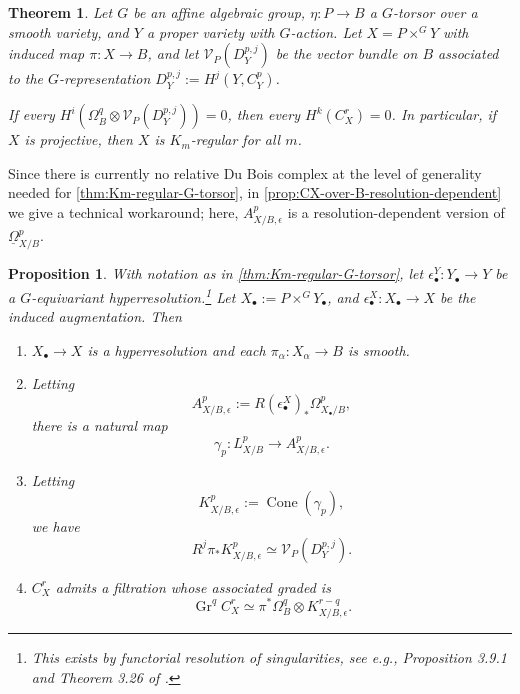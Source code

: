 \documentclass{amsart}
\newtheorem{theorem}{Theorem}[section]
\newtheorem{proposition}[proposition]{Proposition}
\theoremstyle{definition}
\newcommand{\cV}{\mathcal{V}}
\DeclareMathOperator{\Cone}{Cone}
\DeclareMathOperator{\Gr}{Gr}
\begin{document}
\begin{theorem}\label{thm:Km-regular-G-torsor}
Let $G$ be an affine algebraic group, $\eta\colon P\to B$ a $G$-torsor over a smooth variety, and $Y$ a proper variety with $G$-action. Let $X=P\times^G Y$ with induced map $\pi\colon X\to B$, and let $\cV_P(D_Y^{p,j})$ be the vector bundle on $B$ associated to the $G$-representation $D_Y^{p,j}:=H^j(Y,C_Y^p)$.

If every $H^i(\Omega_B^q\otimes\cV_P(D_Y^{p,j}))=0$, then every $H^k(C_X^r)=0$. In particular, if $X$ is projective, then $X$ is $K_m$-regular for all $m$.
\end{theorem}







Since there is currently no relative Du Bois complex at the level of generality needed for \autoref{thm:Km-regular-G-torsor}, in \autoref{prop:CX-over-B-resolution-dependent} we give a technical workaround; here, $A^p_{X/B,\epsilon}$ is a resolution-dependent version of $\underline{\Omega}^p_{X/B}$.




\begin{proposition}\label{prop:CX-over-B-resolution-dependent}
With notation as in \autoref{thm:Km-regular-G-torsor}, let $\epsilon^Y_\bullet\colon Y_\bullet\to Y$ be a $G$-equivariant hyperresolution.\footnote{This exists by functorial resolution of singularities, see e.g., Proposition 3.9.1 and Theorem 3.26 of \cite{KollarResolution}.} Let $X_\bullet:=P\times^G Y_\bullet$, and $\epsilon^X_\bullet:X_\bullet\to X$ be the induced augmentation. Then

\begin{enumerate}
    \item\label{hyerpresolution} $X_\bullet\to X$ is a hyperresolution and each $\pi_\alpha\colon X_\alpha\to B$ is smooth.
    \item\label{ApXBepsilon} Letting
        \[
            A^p_{X/B,\epsilon}:=R(\epsilon^X_\bullet)_*\Omega^p_{X_\bullet/B},
        \]
        there is a natural map 
        \[
            \gamma_p\colon L^p_{X/B}\to A^p_{X/B,\epsilon}.
        \]
    \item\label{RjpiKpXB} Letting
        \[
            K^p_{X/B,\epsilon}:=\Cone(\gamma_p),
        \]
        we have
        \[
            R^j\pi_*K^p_{X/B,\epsilon}\simeq\cV_P(D_Y^{p,j}).
        \]
    \item\label{GrqCrX} $C^r_X$ admits a filtration whose associated graded is
        \[
            \Gr^q C^r_X\simeq\pi^*\Omega_B^q\otimes K^{r-q}_{X/B,\epsilon}.
        \]
\end{enumerate}
\end{proposition}
\end{document}
